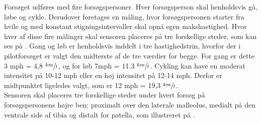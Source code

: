 Forsøget udføres med fire forsøgspersoner. Hver forsøgsperson skal henholdsvis gå, løbe og cykle. Derudover foretages en måling, hvor forsøgspersonen starter fra hvile og med konstant stigningsintervaller skal opnå egen makshastighed. Hvor hver af disse fire målinger skal sensoren placeres på tre forskellige steder, som kan ses på .  %
Gang og løb er henholdsvis inddelt i tre hastighedstrin, hvorfor der i pilotforsøget er valgt den midterste af de tre værdier for begge. For gang er dette 3 mph = 4,8 $\sfrac{km}{t}$, og for løb 7mph = 11.3 $\sfrac{km}{t}$. 
Cykling kan have en moderat intensitet på 10-12 mph eller en høj intensitet på 12-14 mph. Derfor er midtpunktet ligeledes valgt, som er 12 mph = 19,3 $\sfrac{km}{t}$.\citep{Miles2007} \\
Sensoren skal placeres tre forskellige steder under hvert forsøg på forsøgspersonens højre ben: proximalt over den laterale malleolus, medialt på den ventrale side af tibia og distalt for patella, som illustreret på .
